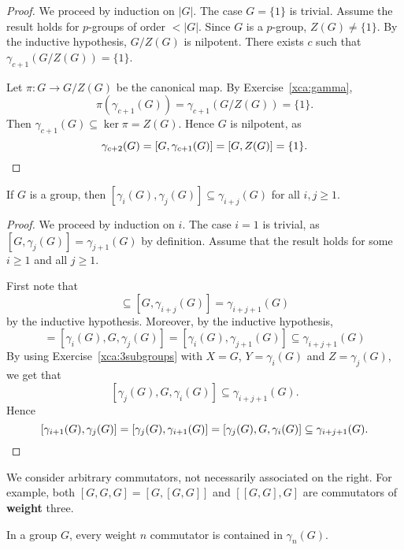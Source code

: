 \begin{proof}
We proceed by induction on $|G|$. The case $G=\{1\}$ is trivial. 
Assume the result holds for $p$-groups of order $<|G|$. Since 
$G$ is a $p$-group, $Z(G)\ne\{1\}$. By the inductive hypothesis, 
$G/Z(G)$ is nilpotent. There exists $c$ such that 
$\gamma_{c+1}(G/Z(G))=\{1\}$. 
	
Let $\pi\colon G\to G/Z(G)$ be the canonical map.  
By Exercise~\ref{xca:gamma},
\[
\pi(\gamma_{c+1}(G))=\gamma_{c+1}(G/Z(G))=\{1\}. 
\]
Then $\gamma_{c+1}(G)\subseteq \ker\pi=Z(G)$. Hence
$G$ is nilpotent, as 
\[	
\gamma_{c+2}(G)=[G,\gamma_{c+1}(G)]=[G,Z(G)]=\{1\}.\qedhere
\]
\end{proof}

\begin{theorem}
\label{thm:gamma}
If $G$ is a group, then $[\gamma_i(G),\gamma_j(G)]\subseteq
\gamma_{i+j}(G)$ for all $i,j\geq1$.	
\end{theorem}

\begin{proof}
We proceed by induction on $i$. The case $i=1$ is trivial, as
$[G,\gamma_j(G)]=\gamma_{j+1}(G)$ by definition. Assume that
the result holds for some $i\geq1$ and all $j\geq 1$. 
	
First note that 
\begin{equation*}
[G,\gamma_i(G),\gamma_j(G)]\subseteq [G,\gamma_{i+j}(G)]=\gamma_{i+j+1}(G)
\end{equation*}
by the inductive hypothesis. Moreover, by the inductive hypothesis, 
\begin{equation*}
[\gamma_i(G),\gamma_j(G),G]=[\gamma_i(G),G,\gamma_j(G)]=[\gamma_{i}(G),\gamma_{j+1}(G)]\subseteq \gamma_{i+j+1}(G)
\end{equation*}
By using Exercise~\ref{xca:3subgroups} with $X=G$, $Y=\gamma_i(G)$ and $Z=\gamma_j(G)$,
we get that 
\[
[\gamma_j(G),G,\gamma_i(G)]\subseteq \gamma_{i+j+1}(G).
\]
Hence  
\[
[\gamma_{i+1}(G),\gamma_{j}(G)]=[\gamma_{j}(G),\gamma_{i+1}(G)]=[\gamma_j(G),G,\gamma_i(G)]\subseteq \gamma_{i+j+1}(G).\qedhere
\]
\end{proof}

We consider arbitrary commutators, not necessarily associated on the right.   
For example, both $[G,G,G]=[G,[G,G]]$ and $[[G,G],G]$ are commutators of \textbf{weight} three. 

\begin{corollary}
In a group $G$, every weight $n$ commutator is contained in 
$\gamma_n(G)$.
\end{corollary}

